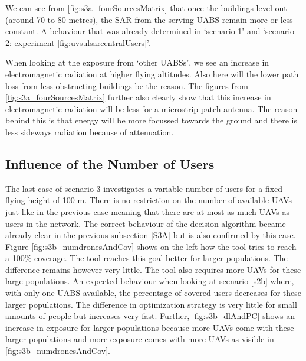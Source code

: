 We can see from \ref{fig:s3a_fourSourcesMatrix} that once the buildings level out (around 70 to 80 metres), the SAR from the serving \gls{UABS} remain 
more or less constant. A behaviour that was already determined in `scenario 1' and `scenario 2: experiment \ref{fig:uvsulsarcentralUsers}'. 

When looking at the exposure from `other \gls{UABS}s', we see an increase in electromagnetic radiation at higher 
flying altitudes.
Also here will the lower path loss from  less obstructing buildings be the reason.
The figures from \ref{fig:s3a_fourSourcesMatrix} further also clearly show that this increase 
in electromagnetic radiation will be less for a microstrip patch antenna. The reason behind this is that energy 
will be more focussed towards the ground and there is less sideways radiation because of attenuation.


\FloatBarrier
\subsection{Influence of the Number of Users}
\label{S3B}

The last case of scenario 3 investigates a variable number of users for a fixed flying height of 100 m. There is no 
restriction on the number of available \gls{UAV}s just like in the previous case meaning that there are at most 
as much \gls{UAV}s as users in the network. The correct behaviour of the decision algorithm became already clear in the previous subsection \ref{S3A} but is also
confirmed by this case.
Figure \ref{fig:s3b_numdronesAndCov} shows on the left how the tool tries to reach a 100\% coverage. The tool reaches this goal 
better for larger populations. The difference remains however very little. The tool also requires more \gls{UAV}s for these large 
populations. An expected behaviour  when looking at scenario \ref{s2b} where, with only one \gls{UABS} available, the percentage of covered users decreases for these larger populations.
 The difference in optimization strategy is very little for small amounts of people but increases very fast. Further, \ref{fig:s3b_dlAndPC} shows an increase 
 in exposure for larger populations because more \gls{UAV}s come with these larger populations and more 
 exposure comes with more \gls{UAV}s as visible in \ref{fig:s3b_numdronesAndCov}.

